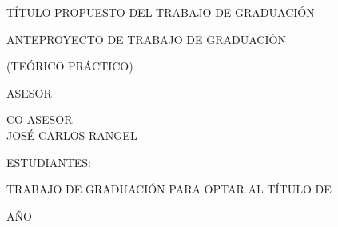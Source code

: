 \newpage
{\bfseries \centering
\Universidad

\Facultad

\vspace{2em}

TÍTULO PROPUESTO DEL TRABAJO DE GRADUACIÓN

\Proyecto

\vspace{2em}

ANTEPROYECTO DE TRABAJO DE GRADUACIÓN

(TEÓRICO PRÁCTICO)

\vspace{3em}

ASESOR \\ \Asesor

\vspace{2em}

CO-ASESOR \\ JOSÉ CARLOS RANGEL

\vspace{2em}

ESTUDIANTES:

\Estudianteuno

\cedulauno

\Estudiantedos

\cedulados

\vspace{2em}

TRABAJO DE GRADUACIÓN PARA OPTAR AL TÍTULO DE \\ \Titulo

\vspace{4em}

AÑO \\ \aaaa

}
